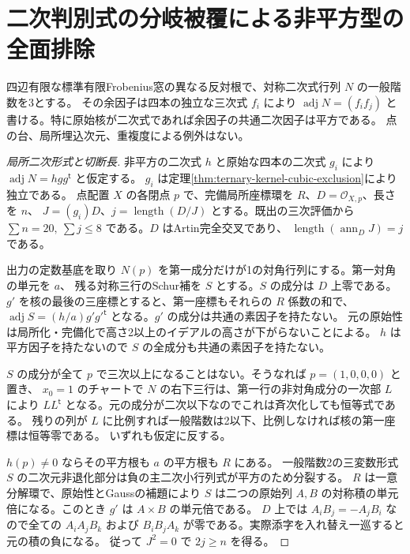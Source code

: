 \section{二次判別式の分岐被覆による非平方型の全面排除}
\label{sec:nonsquare-opposite-discriminant}
\begin{theorem}\label{thm:nonsquare-opposite-discriminant}
四辺有限な標準有限Frobenius窓の異なる反対根で、対称二次式行列 $N$ の一般階数を3とする。
その余因子は四本の独立な三次式 $f_i$ により
$\operatorname{adj}N=(f_i f_j)$ と書ける。特に原始核が二次式であれば余因子の共通二次因子は平方である。
点の台、局所埋込次元、重複度による例外はない。
\end{theorem}

\begin{proof}[局所二次形式と切断長]
非平方の二次式 $h$ と原始な四本の二次式 $g_i$ により $\operatorname{adj}N=hgg^{\mathsf t}$ と仮定する。
$g_i$ は定理\ref{thm:ternary-kernel-cubic-exclusion}により独立である。
点配置 $X$ の各閉点 $p$ で、完備局所座標環を $R$、$D=\mathcal O_{X,p}$、長さを $n$、
$J=(g_i)D$、$j=\operatorname{length}(D/J)$ とする。既出の三次評価から
$\sum n=20,\ \sum j\le8$ である。$D$ はArtin完全交叉であり、
$\operatorname{length}(\operatorname{ann}_D J)=j$ である。

出力の定数基底を取り $N(p)$ を第一成分だけが1の対角行列にする。第一対角の単元を $a$、
残る対称三行のSchur補を $S$ とする。$S$ の成分は $D$ 上零である。
$g'$ を核の最後の三座標とすると、第一座標もそれらの $R$ 係数の和で、
$\operatorname{adj}S=(h/a)g'g'^{\mathsf t}$ となる。$g'$ の成分は共通の素因子を持たない。
元の原始性は局所化・完備化で高さ2以上のイデアルの高さが下がらないことによる。
$h$ は平方因子を持たないので $S$ の全成分も共通の素因子を持たない。

$S$ の成分が全て $p$ で三次以上になることはない。そうなれば $p=(1,0,0,0)$ と置き、
$x_0=1$ のチャートで $N$ の右下三行は、第一行の非対角成分の一次部 $L$ により
$L L^{\mathsf t}$ となる。元の成分が二次以下なのでこれは斉次化しても恒等式である。
残りの列が $L$ に比例すれば一般階数は2以下、比例しなければ核の第一座標は恒等零である。
いずれも仮定に反する。

$h(p)\ne0$ ならその平方根も $a$ の平方根も $R$ にある。
一般階数2の三変数形式 $S$ の二次元非退化部分は負の主二次小行列式が平方のため分裂する。
$R$ は一意分解環で、原始性とGaussの補題により
$S$ は二つの原始列 $A,B$ の対称積の単元倍になる。このとき $g'$ は $A\times B$ の単元倍である。
$D$ 上では $A_i B_j=-A_j B_i$ なので全ての $A_i A_j B_k$ および
$B_i B_j A_k$ が零である。実際添字を入れ替え一巡すると元の積の負になる。
従って $J^2=0$ で $2j\ge n$ を得る。


\end{proof}
